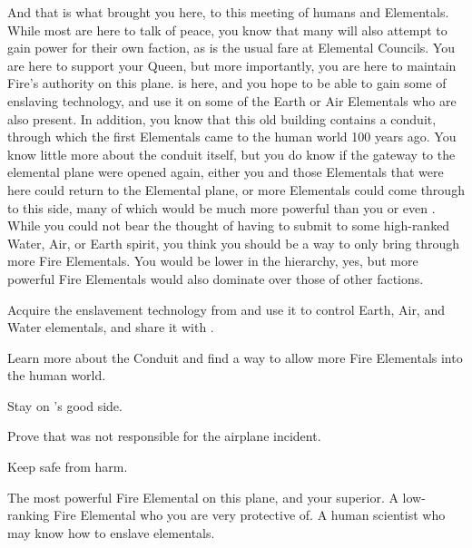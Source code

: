 \documentclass[char]{elementals}
\begin{document}
And that is what brought you here, to this meeting of humans and Elementals.  While most are here to talk of peace, you know that many will also attempt to gain power for their own faction, as is the usual fare at Elemental Councils.  You are here to support your Queen, but more importantly, you are here to maintain Fire's authority on this plane.  \cMS{} is here, and you hope to be able to gain some of  enslaving technology, and use it on some of the Earth or Air Elementals who are also present.  In addition, you know that this old building contains a conduit, through which the first Elementals came to the human world 100 years ago.  You know little more about the conduit itself, but you do know if the gateway to the elemental plane were opened again, either you and those Elementals that were here could return to the Elemental plane, or more Elementals could  come through to this side, many of which would be much more powerful than you or even \cQueen{}.  While you could not bear the thought of having to submit to some high-ranked Water, Air, or Earth spirit, you think you should be a way to only bring through more Fire Elementals.  You would be lower in the hierarchy, yes, but more powerful Fire Elementals would also dominate over those of other factions.  

\begin{itemz}[Goals]
  \item Acquire the enslavement technology from \cMS{} and use it to control Earth, Air, and Water elementals, and share it with \cQueen{}.
  \item Learn more about the Conduit and find a way to allow more Fire Elementals into the human world.
  \item Stay on \cQueen{}'s good side.
  \item Prove that \cJuliet{} was not responsible for the airplane incident.
  \item Keep \cJuliet{} safe from harm.
\end{itemz}

\begin{contacts}
  \contact{\cQueen{}}  The most powerful Fire Elemental on this plane, and your superior.
  \contact{\cJuliet{}}  A low-ranking Fire Elemental who you are very protective of.
  \contact{\cMS{}}  A human scientist who may know how to enslave elementals.
\end{contacts}
\end{document}
